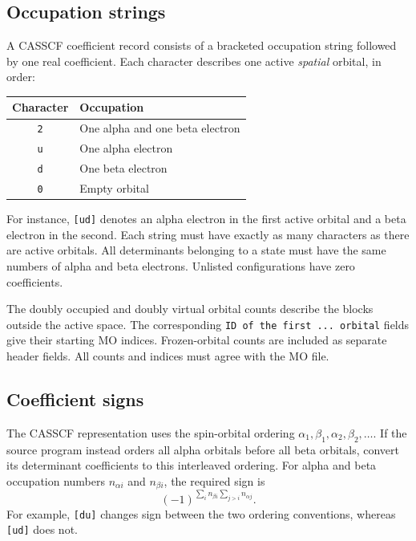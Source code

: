 \subsection*{Occupation strings}
A CASSCF coefficient record consists of a bracketed occupation string followed by one real coefficient. Each character describes one active \emph{spatial} orbital, in order:
\begin{center}
\begin{tabular}{cl}
\hline
Character & Occupation\\\hline
\texttt{2} & One alpha and one beta electron\\
\texttt{u} & One alpha electron\\
\texttt{d} & One beta electron\\
\texttt{0} & Empty orbital\\\hline
\end{tabular}
\end{center}
For instance, \texttt{[ud]} denotes an alpha electron in the first active orbital and a beta electron in the second. Each string must have exactly as many characters as there are active orbitals. All determinants belonging to a state must have the same numbers of alpha and beta electrons. Unlisted configurations have zero coefficients.

The doubly occupied and doubly virtual orbital counts describe the blocks outside the active space. The corresponding \texttt{ID of the first ... orbital} fields give their starting MO indices. Frozen-orbital counts are included as separate header fields. All counts and indices must agree with the MO file.

\subsection*{Coefficient signs}
The CASSCF representation uses the spin-orbital ordering \(\alpha_1,\beta_1,\alpha_2,\beta_2,\ldots\). If the source program instead orders all alpha orbitals before all beta orbitals, convert its determinant coefficients to this interleaved ordering. For alpha and beta occupation numbers \(n_{\alpha i}\) and \(n_{\beta i}\), the required sign is
\begin{equation}
(-1)^{\sum_i n_{\beta i}\sum_{j>i}n_{\alpha j}}.
\end{equation}
For example, \texttt{[du]} changes sign between the two ordering conventions, whereas \texttt{[ud]} does not.
